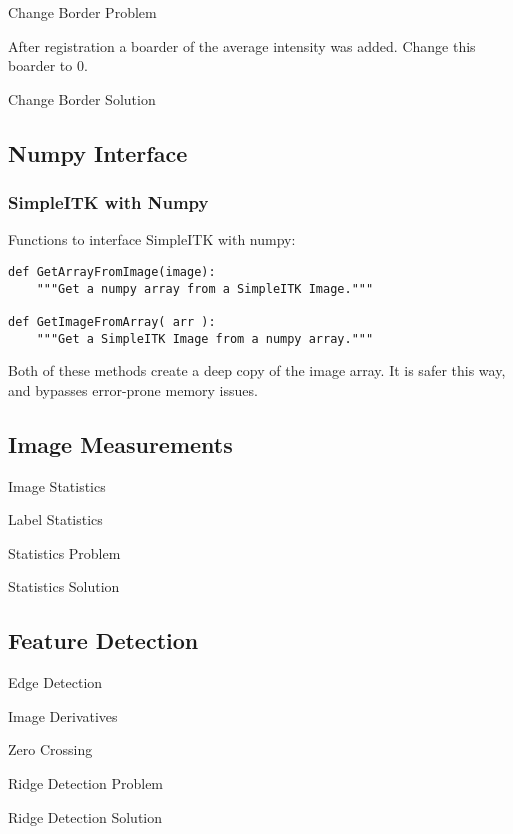 \begin{frame}{Change Border Problem}

After registration a boarder of the average intensity was added. Change this boarder to 0.

\end{frame}

\begin{frame}{Change Border Solution}
\end{frame}

\subsection{Numpy Interface}
\begin{frame}[fragile]
\frametitle{SimpleITK with Numpy}

Functions to interface SimpleITK with numpy:

\lstpython
\begin{lstlisting}
def GetArrayFromImage(image):
    """Get a numpy array from a SimpleITK Image."""

def GetImageFromArray( arr ):
    """Get a SimpleITK Image from a numpy array."""
\end{lstlisting}

Both of these methods create a deep copy of the image array. It is safer this way, and bypasses error-prone memory issues.

\end{frame}

%
%

\subsection{Image Measurements}
\begin{frame}{Image Statistics}
\end{frame}

\begin{frame}{Label Statistics}
\end{frame}


\begin{frame}{Statistics Problem}
\end{frame}

\begin{frame}{Statistics Solution}
\end{frame}


%
%

\subsection{Feature Detection}
\begin{frame}{Edge Detection}
\end{frame}

\begin{frame}{Image Derivatives}
\end{frame}

\begin{frame}{Zero Crossing}
\end{frame}


\begin{frame}{Ridge Detection Problem}
\end{frame}

\begin{frame}{Ridge Detection Solution}
\end{frame}




